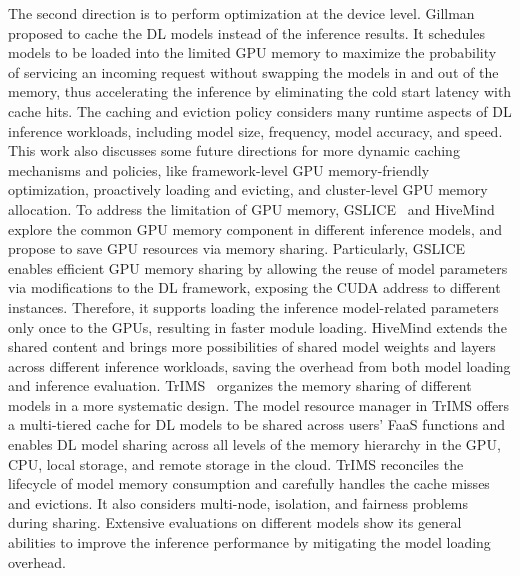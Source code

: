 The second direction is to perform optimization at the device level.  Gillman \etal~\cite{Challenges19} proposed to cache the DL models instead of the inference results. It schedules models to be loaded into the limited GPU memory to maximize the probability of servicing an incoming request without swapping the models in and out of the memory, thus accelerating the inference by eliminating the cold start latency with cache hits. The caching and eviction policy considers many runtime aspects of DL inference workloads, including model size, frequency, model accuracy, and speed. This work also discusses some future directions for more dynamic caching mechanisms and policies, like framework-level GPU memory-friendly optimization, proactively loading and evicting, and cluster-level GPU memory allocation. To address the limitation of GPU memory, GSLICE~\cite{dhakal2020GSLICE} and HiveMind~\cite{narayanan2018accelerating} explore the common GPU memory component in different inference models, and propose to save GPU resources via memory sharing. Particularly, GSLICE enables efficient GPU memory sharing by allowing the reuse of model parameters via modifications to the DL framework, exposing the CUDA address to different instances. Therefore, it supports loading the inference model-related parameters only once to the GPUs, resulting in faster module loading. HiveMind extends the shared content and brings more possibilities of shared model weights and layers across different inference workloads, saving the overhead from both model loading and inference evaluation. TrIMS~\cite{dakkak2019TrIMS} organizes the memory sharing of different models in a more systematic design. The model resource manager in TrIMS offers a multi-tiered cache for DL models to be shared across users' FaaS functions and enables DL model sharing across all levels of the memory hierarchy in the GPU, CPU, local storage, and remote storage in the cloud. TrIMS reconciles the lifecycle of model memory consumption and carefully handles the cache misses and evictions. It also considers multi-node, isolation, and fairness problems during sharing. Extensive evaluations on different models show its general abilities to improve the inference performance by mitigating the model loading overhead.




